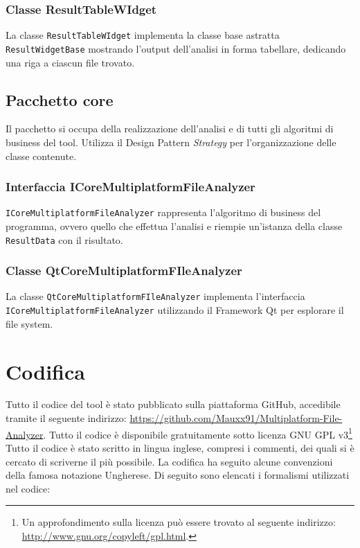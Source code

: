 		\subsubsection{Classe ResultTableWIdget}
			La classe \texttt{ResultTableWIdget} implementa la classe base astratta \texttt{ResultWidgetBase} mostrando l'output dell'analisi in forma tabellare, dedicando una riga a ciascun file trovato.
			
	\subsection{Pacchetto core}
		Il pacchetto si occupa della realizzazione dell'analisi e di tutti gli algoritmi di business del tool. Utilizza il Design Pattern \textit{Strategy} per l'organizzazione delle classe contenute.
		
		\subsubsection{Interfaccia ICoreMultiplatformFileAnalyzer}
			\texttt{ICoreMultiplatformFileAnalyzer} rappresenta l'algoritmo di business del programma, ovvero quello che effettua l'analisi e riempie un'istanza della classe \texttt{ResultData} con il risultato.
			
		\subsubsection{Classe QtCoreMultiplatformFIleAnalyzer}
			La classe \texttt{QtCoreMultiplatformFIleAnalyzer} implementa l'interfaccia\\ \texttt{ICoreMultiplatformFileAnalyzer} utilizzando il Framework Qt\textsuperscript{\textregistered} per esplorare il file system.
			
\section{Codifica}
	Tutto il codice del tool è stato pubblicato sulla piattaforma GitHub\textsuperscript{\textregistered}, accedibile tramite il seguente indirizzo: \url{https://github.com/Mauxx91/Multiplatform-File-Analyzer}. Tutto il codice è disponibile gratuitamente sotto licenza GNU GPL v3\footnote{Un approfondimento sulla licenza può essere trovato al seguente indirizzo: \url{http://www.gnu.org/copyleft/gpl.html}.}\\

	Tutto il codice è stato scritto in lingua inglese, compresi i commenti, dei quali si è cercato di scriverne il più possibile.
	La codifica ha seguito alcune convenzioni della famosa notazione Ungherese. Di seguito sono elencati i formalismi utilizzati nel codice:
	
